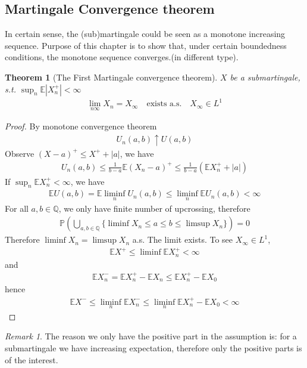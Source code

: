 \documentclass[a4paper,11pt]{book}
\newtheorem{theorem}{Theorem}[section]
\theoremstyle{definition}
\theoremstyle{remark}
\newtheorem*{remark}{Remark}
\begin{document}
\subsection{Martingale Convergence theorem}
In certain sense, the (sub)martingale could be seen as a monotone increasing sequence. Purpose of this chapter is to show that, under certain boundedness conditions, the monotone sequence converges.(in different type).
\begin{theorem}[The First Martingale convergence theorem]
	$X$ be a submartingale, s.t. $\sup_n \mathbb{E}|X_n^+| < \infty$
\begin{align*}
		\lim_{n \infty} X_n = X_\infty \quad \text{exists a.s.} \quad X_\infty \in L^1
\end{align*}
\end{theorem}
\begin{proof}
	By monotone convergence theorem
	\begin{align*}
		U_n(a, b) \uparrow U(a,b)
	\end{align*}
	Observe $(X - a)^+ \le X^+ + |a|$, we have
	\begin{align*}
		U_n(a, b) \leq \frac{1}{b-a} \mathbb{E}(X_n - a)^+ \le \frac{1}{b-a}(\mathbb{E}X_n^+ + |a|)
	\end{align*}
	If $\sup_n \mathbb{E}X_n^+ < \infty$, we have
	\begin{align*}
		\mathbb{E} U(a, b) = \mathbb{E} \liminf_n U_n(a, b) \le \liminf_n \mathbb{E}U_n(a, b) < \infty
	\end{align*}
	For all $a, b \in \mathbb{Q}$, we only have finite number of upcrossing, therefore
	\begin{align*}
		\mathbb{P}(\bigcup_{a, b \in \mathbb{Q}} 
		\{\liminf X_n \le a \le b \le \limsup X_n\}) = 0
	\end{align*}
	Therefore $\liminf X_n = \limsup X_n$ a.s. The limit exists. To see $X_\infty \in L^1$, 
	\begin{align*}
		\mathbb{E}X^+ \le \liminf \mathbb{E}X^+_n < \infty
	\end{align*}
	and
	\begin{align*}
		\mathbb{E}X^-_n = \mathbb{E}X^+_n - \mathbb{E}X_n \le \mathbb{E}X_n^+ - \mathbb{E}X_0
	\end{align*}
	hence
	\begin{align*}
		\mathbb{E}X^- \le \liminf_n \mathbb{E}X_n^- \le \liminf_n \mathbb{E}X_n^+ - \mathbb{E}X_0< \infty
	\end{align*}
\end{proof}
\begin{remark}
The reason we only have the positive part in the assumption is: for a submartingale we have increasing expectation, therefore only the positive parts is of the interest.	
\end{remark}
\end{document}
